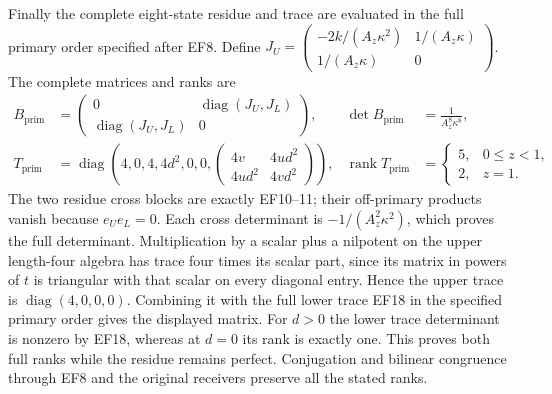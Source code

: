 Finally the complete eight-state residue and trace
are evaluated in the full primary order specified
after EF8. Define
$J_U=\left(\begin{smallmatrix}-2k/(A_z\kappa^2)&1/(A_z\kappa)\\
1/(A_z\kappa)&0\end{smallmatrix}\right)$.
The complete matrices and ranks are
\begin{equation}
\begin{aligned}
 B_{\mathrm{prim}}&=\begin{pmatrix}
 0&\operatorname{diag}(J_U,J_L)\\
 \operatorname{diag}(J_U,J_L)&0\end{pmatrix},
 &\det B_{\mathrm{prim}}&=\frac1{A_z^8\kappa^8},\\
 T_{\mathrm{prim}}&=\operatorname{diag}\left(
 4,0,4,4d^2,0,0,
 \begin{pmatrix}4v&4ud^2\\4ud^2&4vd^2\end{pmatrix}\right),
 &\operatorname{rank}T_{\mathrm{prim}}&=
 \begin{cases}5,&0\le z<1,\\2,&z=1.\end{cases}
\end{aligned}\tag{EF25}
\end{equation}
The two residue cross blocks are exactly EF10--11;
their off-primary products vanish because $e_Ue_L=0$.
Each cross determinant is $-1/(A_z^2\kappa^2)$,
which proves the full determinant. Multiplication
by a scalar plus a nilpotent on the upper length-four
algebra has trace four times its scalar part, since
its matrix in powers of $t$ is triangular with that
scalar on every diagonal entry. Hence the upper
trace is $\operatorname{diag}(4,0,0,0)$. Combining
it with the full lower trace EF18 in the specified
primary order gives the displayed matrix. For $d>0$
the lower trace determinant is nonzero by EF18,
whereas at $d=0$ its rank is exactly one. This proves
both full ranks while the residue remains perfect.
Conjugation and bilinear congruence through EF8 and
the original receivers preserve all the stated ranks.
